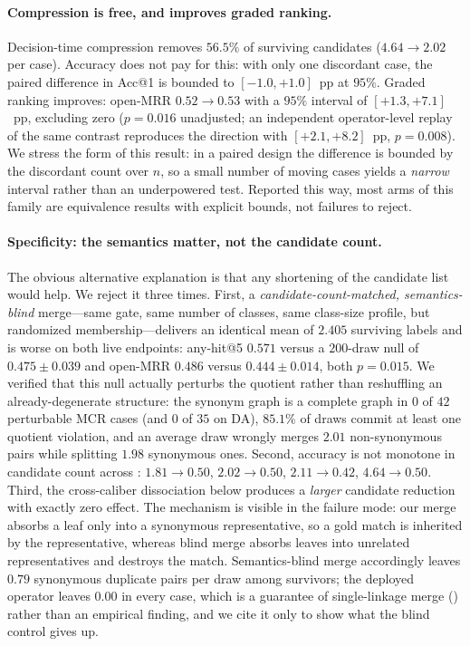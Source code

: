 \paragraph{Compression is free, and improves graded ranking.}
Decision-time compression removes $56.5\%$ of surviving candidates ($4.64 \rightarrow 2.02$ per case).
Accuracy does not pay for this: with only one discordant case, the paired difference in Acc@1 is bounded to $[-1.0, +1.0]$~pp at $95\%$.
Graded ranking improves: open-MRR $0.52 \rightarrow 0.53$ with a $95\%$ interval of $[+1.3, +7.1]$~pp, excluding zero ($p=0.016$ unadjusted; an independent operator-level replay of the same contrast reproduces the direction with $[+2.1, +8.2]$~pp, $p=0.008$).
We stress the form of this result: in a paired design the difference is bounded by the discordant count over $n$, so a small number of moving cases yields a \emph{narrow} interval rather than an underpowered test.
Reported this way, most arms of this family are equivalence results with explicit bounds, not failures to reject.

\paragraph{Specificity: the semantics matter, not the candidate count.}
The obvious alternative explanation is that any shortening of the candidate list would help.
We reject it three times.
First, a \emph{candidate-count-matched, semantics-blind} merge---same gate, same number of classes, same class-size profile, but randomized membership---delivers an identical mean of $2.405$ surviving labels and is worse on both live endpoints: any-hit@5 $0.571$ versus a $200$-draw null of $0.475 \pm 0.039$ and open-MRR $0.486$ versus $0.444 \pm 0.014$, both $p=0.015$.
We verified that this null actually perturbs the quotient rather than reshuffling an already-degenerate structure: the synonym graph is a complete graph in $0$ of $42$ perturbable MCR cases (and $0$ of $35$ on DA), $85.1\%$ of draws commit at least one quotient violation, and an average draw wrongly merges $2.01$ non-synonymous pairs while splitting $1.98$ synonymous ones.
Second, accuracy is not monotone in candidate count across : $1.81 \rightarrow 0.50$, $2.02 \rightarrow 0.50$, $2.11 \rightarrow 0.42$, $4.64 \rightarrow 0.50$.
Third, the cross-caliber dissociation below produces a \emph{larger} candidate reduction with exactly zero effect.
The mechanism is visible in the failure mode: our merge absorbs a leaf only into a synonymous representative, so a gold match is inherited by the representative, whereas blind merge absorbs leaves into unrelated representatives and destroys the match.
Semantics-blind merge accordingly leaves $0.79$ synonymous duplicate pairs per draw among survivors; the deployed operator leaves $0.00$ in every case, which is a guarantee of single-linkage merge () rather than an empirical finding, and we cite it only to show what the blind control gives up.

